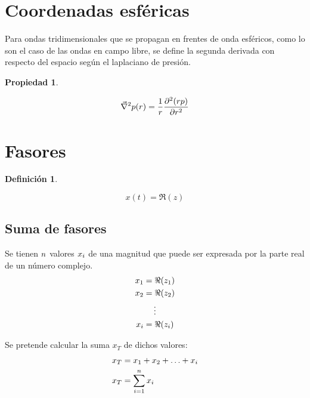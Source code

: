 \documentclass[a5paper,12pt,twoside]{book}
\newtheorem{defn}{{Definición}}[chapter]
\newtheorem{prop}{{Propiedad}}[chapter]
\begin{document}
\section{Coordenadas esféricas}

Para ondas tridimensionales que se propagan en frentes de onda esféricos, como lo son el caso de las ondas en campo libre, se define la segunda derivada con respecto del espacio según el laplaciano de presión.

\begin{mdframed}[style=PropertyFrame]
    \begin{prop}
    \end{prop}
    \begin{equation*}
        \Vec{\nabla}^2 p(r) = \frac{1}{r} \frac{\partial^2 (rp)}{\partial r^2}
    \end{equation*}
\end{mdframed}


\section{Fasores}

\begin{mdframed}[style=DefinitionFrame]
    \begin{defn}
    \end{defn}
    \begin{equation*}
        x(t) = \Re (z)
    \end{equation*}
\end{mdframed}

\subsection{Suma de fasores}
Se tienen $n$ valores $x_i$ de una magnitud que puede ser expresada por la parte real de un número complejo.
\begin{gather*}
    x_1 = \Re(z_1)
    \\
    x_2 = \Re(z_2)
    \\
    \vdots
    \\
    x_i = \Re(z_i)
\end{gather*}

Se pretende calcular la suma $x_T$ de dichos valores:
\begin{align*}
    x_T &= x_1 + x_2 + \ldots + x_i
    \\
    x_T &=  \sum_{i=1}^n x_i
\end{align*}
\end{document}
